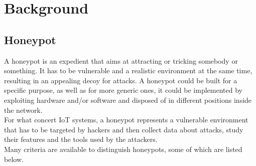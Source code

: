 \chapter{Background}
\section{Honeypot}
A honeypot is an expedient that aims at attracting or tricking somebody or something. It has to be
vulnerable and a realistic environment at the same time, resulting in an appealing decoy for attacks.
A honeypot could be built for a specific purpose, as well as for more generic ones, it could be implemented by exploiting hardware and/or software and disposed of in different positions inside the network.\\ For
what concert IoT systems, a honeypot represents a vulnerable environment that has to be targeted by
hackers and then collect data about attacks, study their features and the tools used by the attackers.\\
Many criteria are available to distinguish honeypots, some of which are listed below.

